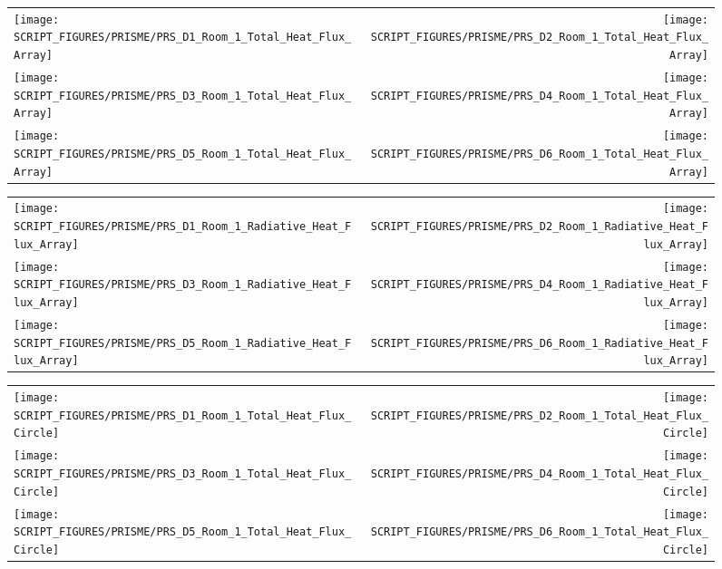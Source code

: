 \begin{figure}[!ht]
\begin{tabular*}{\textwidth}{l@{\extracolsep{\fill}}r}
\texttt{[image: SCRIPT\_FIGURES/PRISME/PRS\_D1\_Room\_1\_Total\_Heat\_Flux\_Array]} &
\texttt{[image: SCRIPT\_FIGURES/PRISME/PRS\_D2\_Room\_1\_Total\_Heat\_Flux\_Array]} \\
\texttt{[image: SCRIPT\_FIGURES/PRISME/PRS\_D3\_Room\_1\_Total\_Heat\_Flux\_Array]} &
\texttt{[image: SCRIPT\_FIGURES/PRISME/PRS\_D4\_Room\_1\_Total\_Heat\_Flux\_Array]} \\
\texttt{[image: SCRIPT\_FIGURES/PRISME/PRS\_D5\_Room\_1\_Total\_Heat\_Flux\_Array]} &
\texttt{[image: SCRIPT\_FIGURES/PRISME/PRS\_D6\_Room\_1\_Total\_Heat\_Flux\_Array]}
\end{tabular*}
\label{PRISME_Wall_Array_THF_Room_1}
\end{figure}

\begin{figure}[p]
\begin{tabular*}{\textwidth}{l@{\extracolsep{\fill}}r}
\texttt{[image: SCRIPT\_FIGURES/PRISME/PRS\_D1\_Room\_1\_Radiative\_Heat\_Flux\_Array]} &
\texttt{[image: SCRIPT\_FIGURES/PRISME/PRS\_D2\_Room\_1\_Radiative\_Heat\_Flux\_Array]} \\
\texttt{[image: SCRIPT\_FIGURES/PRISME/PRS\_D3\_Room\_1\_Radiative\_Heat\_Flux\_Array]} &
\texttt{[image: SCRIPT\_FIGURES/PRISME/PRS\_D4\_Room\_1\_Radiative\_Heat\_Flux\_Array]} \\
\texttt{[image: SCRIPT\_FIGURES/PRISME/PRS\_D5\_Room\_1\_Radiative\_Heat\_Flux\_Array]} &
\texttt{[image: SCRIPT\_FIGURES/PRISME/PRS\_D6\_Room\_1\_Radiative\_Heat\_Flux\_Array]}
\end{tabular*}
\label{PRISME_Wall_Array_RHF_Room_1}
\end{figure}

\begin{figure}[p]
\begin{tabular*}{\textwidth}{l@{\extracolsep{\fill}}r}
\texttt{[image: SCRIPT\_FIGURES/PRISME/PRS\_D1\_Room\_1\_Total\_Heat\_Flux\_Circle]} &
\texttt{[image: SCRIPT\_FIGURES/PRISME/PRS\_D2\_Room\_1\_Total\_Heat\_Flux\_Circle]} \\
\texttt{[image: SCRIPT\_FIGURES/PRISME/PRS\_D3\_Room\_1\_Total\_Heat\_Flux\_Circle]} &
\texttt{[image: SCRIPT\_FIGURES/PRISME/PRS\_D4\_Room\_1\_Total\_Heat\_Flux\_Circle]} \\
\texttt{[image: SCRIPT\_FIGURES/PRISME/PRS\_D5\_Room\_1\_Total\_Heat\_Flux\_Circle]} &
\texttt{[image: SCRIPT\_FIGURES/PRISME/PRS\_D6\_Room\_1\_Total\_Heat\_Flux\_Circle]}
\end{tabular*}
\label{PRISME_Wall_Circle_THF_Room_1}
\end{figure}

